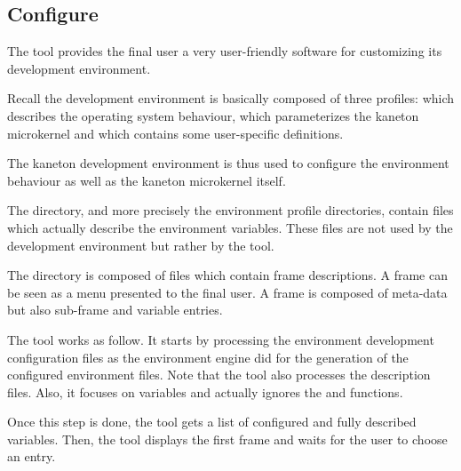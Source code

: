 %
%
%
%
%
%

%
%

\subsection{Configure}
\label{section:configure}

The  tool provides the final user a very user-friendly
software for customizing its development environment.

Recall the development environment is basically composed of three profiles:
 which describes the operating system behaviour, 
which parameterizes the kaneton microkernel and  which contains
some user-specific definitions.

The kaneton development environment is thus used to configure the environment
behaviour as well as the kaneton microkernel itself.

The  directory, and more precisely the environment
profile directories, contain  files which actually
describe the environment variables. These files are not used by the development
environment but rather by the  tool.

The  directory is composed of  files
which contain frame descriptions. A frame can be seen as a menu presented
to the final user. A frame is composed of meta-data but also sub-frame and
variable entries.

The  tool works as follow. It starts by processing the
environment development configuration files as the environment engine did
for the generation of the configured environment files. Note that the
 tool also processes the description files. Also, it
focuses on variables and actually ignores the  and 
functions.

Once this step is done, the tool gets a list of configured and fully described
variables. Then, the  tool displays the first frame and
waits for the user to choose an entry.

